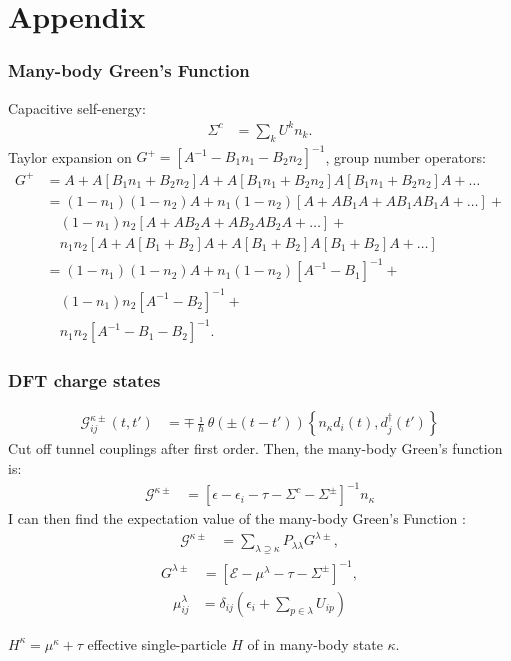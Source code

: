 \section*{Appendix}
\begin{frame}
    \frametitle{Many-body Green's Function}
    Capacitive self-energy:
    \begin{align*}
    \Sigma^{c} &= \sum_k U^k n_k
    \label{eq:selfenergycapacitive}.
    \end{align*} Taylor expansion on $G^+  = \left[ A^{-1} - B_1 n_1 - B_2 n_2 \right]^{-1}$, group number operators:
    \begin{align*}
    G^+ &= A + A\left[B_1 n_1 + B_2 n_2\right]A + A\left[B_1 n_1 + B_2 n_2\right]  A\left[B_1 n_1 + B_2 n_2\right]  A + \ldots \\
    &= (1-n_1)(1-n_2) A + n_1 (1-n_2)\left[A + AB_1 A + AB_1AB_1A + \ldots \right] + \\
    &\quad (1-n_1)n_2 \left[ A + AB_2A + AB_2AB_2A + \ldots \right] +\\
    &\quad n_1 n_2 \left[ A + A\left[B_1 + B_2\right]A+ A\left[B_1 + B_2\right]A\left[B_1 + B_2\right]A + \ldots\right] \\
    &= (1-n_1)(1-n_2) A + n_1 (1-n_2) \left[ A^{-1} - B_1\right]^{-1} + \\&\quad(1-n_1) n_2 \left[ A^{-1} - B_2\right]^{-1} +\\&\quad n_1 n_2 \left[A^{-1} - B_1 - B_2 \right]^{-1}.
    \end{align*}
\end{frame}

\begin{frame}
    \frametitle{DFT charge states}
    \vspace{-3mm}
\begin{align*}
\mathscr{G}^{\kappa\pm}_{ij} (t,t') &= \mp \frac{\imath}{\hbar} \theta(\pm(t-t'))\left\{ n_\kappa d_i(t), d_j^\dagger (t')\right\}
\end{align*}Cut off tunnel couplings after first order. Then, the many-body Green's function is:
\begin{align*}
\mathscr{G}^{\kappa\pm} &= \left[ \epsilon - \epsilon_i - \tau - \Sigma^c - \Sigma^\pm\right]^{-1} n_\kappa
\end{align*}
I can then find the expectation value of the many-body Green's Function :
\begin{align*}
\mathscr{G}^{\kappa\pm} &= \sum_{\lambda\supseteq\kappa} P_{\lambda\lambda} G^{\lambda\pm},
\end{align*}
\begin{align*}
G^{\lambda\pm} &= \left[\mathscr{E} - \mu^\lambda - \tau - \Sigma^\pm \right]^{-1},
\end{align*} 
\begin{align*}
\mu^\lambda_{ij} &= \delta_{ij} \left( \epsilon_i + \sum_{p\in\lambda} U_{ip} \right)
\end{align*}

$H^\kappa = \mu^\kappa + \tau$ effective single-particle $H$ of in many-body state $\kappa$.
\end{frame}
